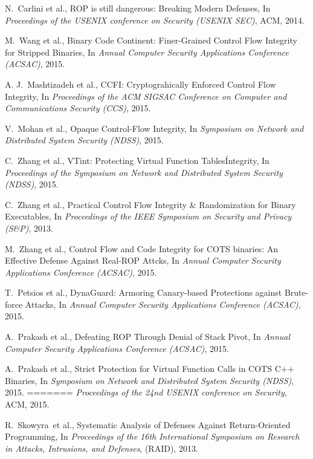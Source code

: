 \documentclass[11pt,a4paper,bibtotoc,idxtotoc,headsepline,footsepline,footexclude,BCOR20mm,DIV10]{scrbook}
\begin{document}
\begin{thebibliography}{50}
N.~Carlini et al., {ROP is still dangerous: Breaking Modern Defenses}, In
\emph{Proceedings of the USENIX conference on Security (USENIX SEC)}, ACM, 2014.

M.~Wang et al., {Binary Code Continent: Finer-Grained Control Flow Integrity for Stripped Binaries}, In
\emph{Annual Computer Security Applications Conference (ACSAC)}, 2015.

A. J.~Mashtizadeh et al., {CCFI: Cryptograhically Enforced Control Flow Integrity}, In
\emph{Proceedings of the ACM SIGSAC Conference on Computer and Communications Security (CCS)}, 2015.

V.~Mohan et al., {Opaque Control-Flow Integrity}, In
\emph{Symposium on Network and Distributed System Security (NDSS)}, 2015.

C.~Zhang et al., {VTint: Protecting Virtual Function Tables\' Integrity}, In
\emph{Proceedings of the Symposium on Network and Distributed System Security (NDSS)}, 2015.

C.~Zhang et al., {Practical Control Flow Integrity \& Randomization for Binary Executables}, In
\emph{Proceedings of the IEEE Symposium on Security and Privacy (S\&P)}, 2013.

M.~Zhang et al., {Control Flow and Code Integrity for COTS binaries: An Effective Defense Against Real-ROP Attcks}, In
\emph{Annual Computer Security Applications Conference (ACSAC)}, 2015.

T.~Petsios et al., {DynaGuard: Armoring Canary-based Protections against Brute-force Attacks}, In
\emph{Annual Computer Security Applications Conference (ACSAC)}, 2015.

A.~Prakash et al., {Defeating ROP Through Denial of Stack Pivot}, In
\emph{Annual Computer Security Applications Conference (ACSAC)}, 2015.

A.~Prakash et al., {Strict Protection for Virtual Function Calls in COTS C++ Binaries}, In
\emph{Symposium on Network and Distributed System Security (NDSS)}, 2015.
=======
\emph{Proceedings of the 24nd USENIX conference on Security}, ACM, 2015.

R.~Skowyra~et al., {Systematic Analysis of Defenses Against Return-Oriented Programming}, In
\emph{Proceedings of the 16th International Symposium on Research in Attacks, Intrusions, and Defenses},
(RAID), 2013.


\end{thebibliography}
\end{document}
